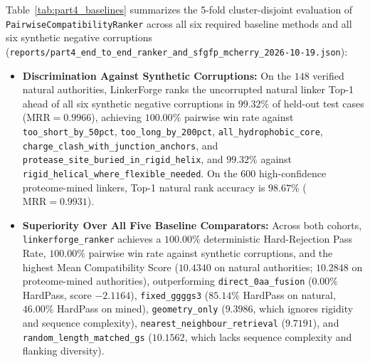 \documentclass[11pt]{article}
\begin{document}
Table~\ref{tab:part4_baselines} summarizes the 5-fold cluster-disjoint evaluation of \texttt{PairwiseCompatibilityRanker} across all six required baseline methods and all six synthetic negative corruptions (\texttt{reports/part4\_end\_to\_end\_ranker\_and\_sfgfp\_mcherry\_2026-10-19.json}):
\begin{itemize}
  \item \textbf{Discrimination Against Synthetic Corruptions:} On the $148$ verified natural authorities, LinkerForge ranks the uncorrupted natural linker Top-1 ahead of all six synthetic negative corruptions in $\mathbf{99.32\%}$ of held-out test cases ($\text{MRR} = \mathbf{0.9966}$), achieving $100.00\%$ pairwise win rate against \texttt{too\_short\_by\_50pct}, \texttt{too\_long\_by\_200pct}, \texttt{all\_hydrophobic\_core}, \texttt{charge\_clash\_with\_junction\_anchors}, and \texttt{protease\_site\_buried\_in\_rigid\_helix}, and $99.32\%$ against \texttt{rigid\_helical\_where\_flexible\_needed}. On the $600$ high-confidence proteome-mined linkers, Top-1 natural rank accuracy is $\mathbf{98.67\%}$ ($\text{MRR} = \mathbf{0.9931}$).
  \item \textbf{Superiority Over All Five Baseline Comparators:} Across both cohorts, \texttt{linkerforge\_ranker} achieves a $\mathbf{100.00\%}$ deterministic Hard-Rejection Pass Rate, $\mathbf{100.00\%}$ pairwise win rate against synthetic corruptions, and the highest Mean Compatibility Score ($\mathbf{10.4340}$ on natural authorities; $\mathbf{10.2848}$ on proteome-mined authorities), outperforming \texttt{direct\_0aa\_fusion} ($0.00\%$ HardPass, score $-2.1164$), \texttt{fixed\_ggggs3} ($85.14\%$ HardPass on natural, $46.00\%$ HardPass on mined), \texttt{geometry\_only} ($9.3986$, which ignores rigidity and sequence complexity), \texttt{nearest\_neighbour\_retrieval} ($9.7191$), and \texttt{random\_length\_matched\_gs} ($10.1562$, which lacks sequence complexity and flanking diversity).
\end{itemize}
\end{document}

